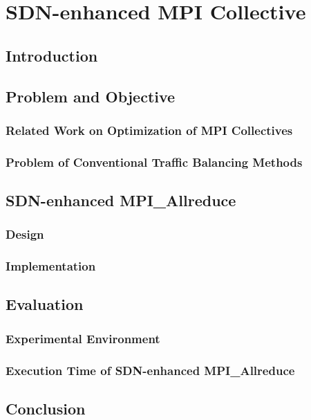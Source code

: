 \chapter{SDN-enhanced MPI Collective}

\section{Introduction}

\section{Problem and Objective}

\subsection{Related Work on Optimization of MPI Collectives}

\subsection{Problem of Conventional Traffic Balancing Methods}

\section{SDN-enhanced MPI\_Allreduce}

\subsection{Design}

\subsection{Implementation}

\section{Evaluation}

\subsection{Experimental Environment}

\subsection{Execution Time of SDN-enhanced MPI\_Allreduce}

\section{Conclusion}
